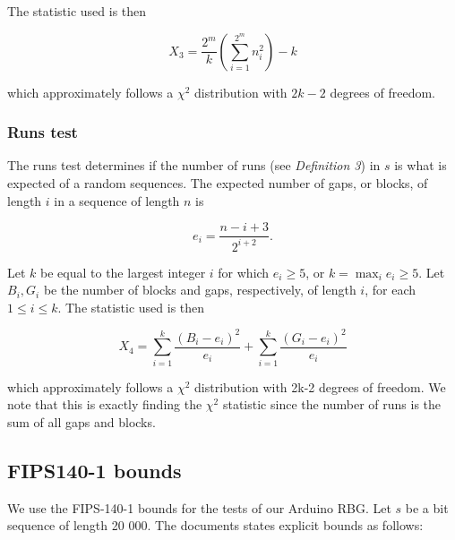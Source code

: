 \documentclass[a4paper]{article}           %
\begin{document}
The statistic used is then

\begin{equation}
X_3 = \frac{2^m}{k} \left( \sum_{i=1}^{2^m} n_i^2 \right) - k
\end{equation}

which approximately follows a $\chi^2$ distribution with $2k - 2$ degrees of freedom.
 
\subsubsection{Runs test}

The runs test determines if the number of runs (see \textit{Definition 3}) in $s$ is what is expected of a random sequences. The expected number of gaps, or blocks, of length $i$ in a sequence of length $n$ is

\[
e_i = \frac{n-i+3}{2^{i+2}}.
\]

Let $k$ be equal to the largest integer $i$ for which $e_i \geq 5$, or $k = \max_i e_i \geq 5$. Let $B_i, G_i$ be the number of blocks and gaps, respectively, of length $i$, for each $ 1 \leq i \leq k$. The statistic used is then

\begin{equation}
X_4 = \sum_{i=1}^k \frac{(B_i - e_i)^2}{e_i} + \sum_{i=1}^k \frac{(G_i - e_i)^2}{e_i}
\end{equation}

which approximately follows a $\chi^2$ distribution with 2k-2 degrees of freedom. We note that this is exactly finding the $\chi^2$ statistic since the number of runs is the sum of all gaps and blocks. 

\subsection{FIPS140-1 bounds}

We use the FIPS-140-1 bounds\cite{fips140} for the tests of our Arduino RBG. Let $s$ be a bit sequence of length 20 000. The documents states explicit bounds as follows:
\end{document}
